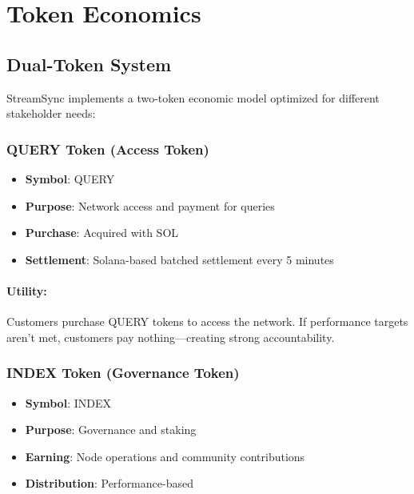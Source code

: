 \documentclass[12pt,a4paper]{article}
\begin{document}
\section{Token Economics}

\subsection{Dual-Token System}

StreamSync implements a two-token economic model optimized for different stakeholder needs:

\subsubsection{QUERY Token (Access Token)}

\begin{itemize}
    \item \textbf{Symbol}: QUERY
    \item \textbf{Purpose}: Network access and payment for queries
    \item \textbf{Purchase}: Acquired with SOL
    \item \textbf{Settlement}: Solana-based batched settlement every 5 minutes
\end{itemize}

\paragraph{Utility:} Customers purchase QUERY tokens to access the network. If performance targets aren't met, customers pay nothing—creating strong accountability.

\subsubsection{INDEX Token (Governance Token)}

\begin{itemize}
    \item \textbf{Symbol}: INDEX
    \item \textbf{Purpose}: Governance and staking
    \item \textbf{Earning}: Node operations and community contributions
    \item \textbf{Distribution}: Performance-based
\end{itemize}
\end{document}
